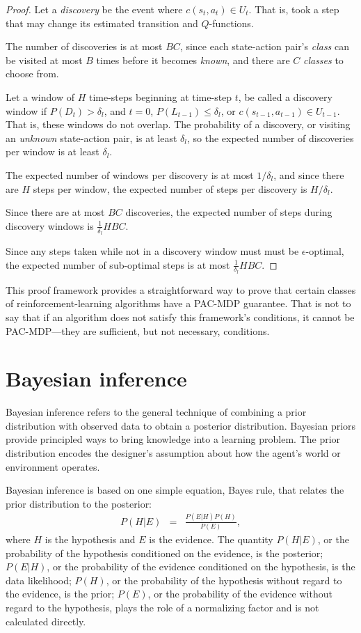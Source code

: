 \begin{proof}
Let a \emph{discovery} be the event where $c(s_t,a_t) \in U_t$. That is, \A took a step that may change its estimated transition and $Q$-functions.

The number of discoveries is at most $B C$, since each state-action pair's \emph{class} can be visited at most $B$ times before it becomes \emph{known}, and there are $C$ \emph{classes} to choose from.

Let a window of $H$ time-steps beginning at time-step $t$, be called a discovery window if $P(D_t) > \delta_l$, and $t=0$, $P(L_{t-1}) \leq \delta_l$, or $c(s_{t-1},a_{t-1}) \in U_{t-1}$. That is, these windows do not overlap. The probability of a discovery, or visiting an \emph{unknown} state-action pair, is at least $\delta_l$, so the expected number of discoveries per window is at least $\delta_l$.

The expected number of windows per discovery is at most $1/\delta_l$, and since there are $H$ steps per window, the expected number of steps per discovery is $H / \delta_l$.

Since there are at most $B C$ discoveries, the expected number of steps during discovery windows is $\frac 1 {\delta_l} H B C$.

Since any steps taken while not in a discovery window must must be $\epsilon$-optimal, the expected number of sub-optimal steps is at most $\frac 1 {\delta_l} H B C$.
\end{proof}

This proof framework provides a straightforward way to prove that certain classes of reinforcement-learning algorithms have a PAC-MDP guarantee. That is not to say that if an algorithm does not satisfy this framework's conditions, it cannot be PAC-MDP---they are sufficient, but not necessary, conditions.

\section{Bayesian inference}
\label{sec:intro:inf}

Bayesian inference refers to the general technique of combining a prior distribution with observed data to obtain a posterior distribution. Bayesian priors provide principled ways to bring knowledge into a learning problem. The prior distribution encodes the designer's assumption about how the agent's world or environment operates.

Bayesian inference is based on one simple equation, Bayes rule, that relates the prior distribution to the posterior:
\begin{eqnarray}
\label{intro:eqn:bayes} P(H|E) &=& \frac{P(E|H)P(H)}{P(E)},
\end{eqnarray}
where $H$ is the hypothesis and $E$ is the evidence. The quantity $P(H|E)$, or the probability of the hypothesis conditioned on the evidence, is the posterior; $P(E|H)$, or the probability of the evidence conditioned on the hypothesis, is the data likelihood; $P(H)$, or the probability of the hypothesis without regard to the evidence, is the prior; $P(E)$, or the probability of the evidence without regard to the hypothesis, plays the role of a normalizing factor and is not calculated directly.

